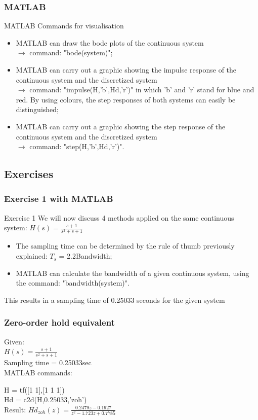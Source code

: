 \begin{frame}
	\frametitle{MATLAB}
	\begin{block}{MATLAB Commands for visualisation}
		\begin{itemize}
			\item MATLAB can draw the bode plots of the continuous system\\ 
			$\rightarrow$ command: "bode(system)";
			\item MATLAB can carry out a graphic showing the impulse response of the continuous system and the discretized system\\
			$\rightarrow$ command: "impulse(H,'b',Hd,'r')" in which 'b' and 'r' stand for blue and red. By using colours, the step responses of both systems can easily be distinguished;
			\item MATLAB can carry out a graphic showing the step response of the continuous system and the discretized system\\
			$\rightarrow$ command: "step(H,'b',Hd,'r')".
		\end{itemize}
	\end{block}
\end{frame}

\subsection{Exercises}
\begin{frame}
	\frametitle{Exercise 1 with MATLAB}
	\begin{block}{Exercise 1}
		We will now discuss 4 methods applied on the same continuous system:
		$H(s) = \frac{s + 1}{s^{2} + s + 1}$\\
		\begin{itemize}
		\item The sampling time can be determined by the rule of thumb previously explained: $T_s$ = 2.2Bandwidth;
		\item MATLAB can calculate the bandwidth of a given continuous system, using the command: "bandwidth(system)".
		\end{itemize}
		This results in a sampling time of 0.25033 seconds for the given system
	\end{block}
\end{frame}

\begin{frame}
	\frametitle{Zero-order hold equivalent}
	\begin{example}
		Given:\\
		$H(s) = \frac{s + 1}{s^{2} + s + 1}$\\
		Sampling time = 0.25033sec\\
		\vspace{0.8em}
		MATLAB commands:
		
		H = tf([1 1],[1 1 1]) \\
		Hd = c2d(H,$0.25033$,'zoh')\\
		\vspace{0.8em}
		Result:
		$Hd_{zoh}(z) = \frac{0.2479z - 0.1927}{z^{2} -1.723z + 0.7785}$
	\end{example}
\end{frame}

